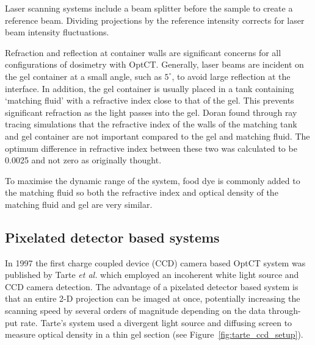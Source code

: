 \documentclass[12pt]{article}
\begin{document}
Laser scanning systems include a  beam splitter before the sample to create a reference beam. Dividing projections by the reference intensity  corrects for laser beam intensity fluctuations. \cite{Gore:1999tg}

Refraction and reflection at container walls are significant concerns for all configurations of dosimetry with OptCT. Generally, laser beams are incident on the gel container at a small angle, such as $5^{\circ}$, to avoid large reflection at the interface. In addition, the gel container is usually placed in a tank containing `matching fluid' with a refractive index close to that of the gel. This prevents significant refraction as the light passes into the gel. Doran found through ray tracing simulations that the refractive index of the walls of the matching tank and  gel container are not important compared to the gel and matching fluid. The optimum difference in refractive index between these two was calculated to be 0.0025 and not zero as originally thought.\cite{Doran:2001ee}

To maximise the dynamic range of the system, food dye is commonly added to the matching fluid so both the refractive index and optical density of the matching fluid and gel are very similar.\cite{Krstajic:2006kna} 




\subsection{Pixelated detector based systems}

In 1997 the first charge coupled device (CCD) camera based OptCT system was published by Tarte \textit{et al.} which employed an incoherent white light source and CCD camera detection. \cite{Tarte:2007} The advantage  of a pixelated detector based system  is that an entire 2-D projection can be imaged at once, potentially increasing the scanning speed by several  orders of magnitude depending on the data through-put rate. Tarte's system used a divergent light source and diffusing screen to measure optical density in a thin gel section (see Figure~\ref{fig:tarte_ccd_setup}). 
\end{document}
